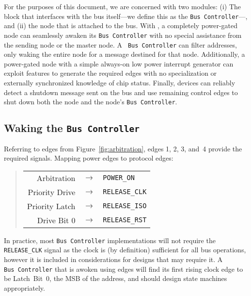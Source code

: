 For the purposes of this document, we are concerned with two modules: (i) The
block that interfaces with the bus itself---we define this as the {\tt Bus
Controller}---, and (ii) the node that is attached to the bus. With \bus, a
completely power-gated node can seamlessly awaken its {\tt Bus~Controller}
with no special assistance from the sending node or the master node. A {\tt
Bus~Controller} can filter addresses, only waking the entire node for a message
destined for that node. Additionally, a power-gated node with a simple
always-on low power interrupt generator can exploit \bus features to generate
the required edges with no specialization or externally synchronized knowledge
of chip status. Finally, devices can reliably detect a shutdown message sent
on the bus and use remaining control edges to shut down both the node and the
node's {\tt Bus~Controller}.

\subsection{Waking the \texttt{Bus~Controller}}
\label{sec:power-bus-controller-wakeup}
Referring to edges from Figure~\ref{fig:arbitration}, edges 1, 2, 3, and~4
provide the required signals. Mapping power edges to \bus protocol edges:

\begin{quote}
\begin{tabular}{r c l}
  Arbitration    & $\rightarrow$ & {\tt POWER\_ON} \\
  Priority Drive & $\rightarrow$ & {\tt RELEASE\_CLK} \\
  Priority Latch & $\rightarrow$ & {\tt RELEASE\_ISO} \\
  Drive Bit 0    & $\rightarrow$ & {\tt RELEASE\_RST} \\
\end{tabular}
\end{quote}

In practice, most {\tt Bus~Controller} implementations will not require the
{\tt RELEASE\_CLK} signal as the \bus clock is (by definition) sufficient for
all bus operations, however it is included in considerations for designs that
may require it. A {\tt Bus~Controller} that is awoken using \bus edges will
find its first rising clock edge to be Latch~Bit~0, the MSB of the address,
and should design state machines appropriately.

